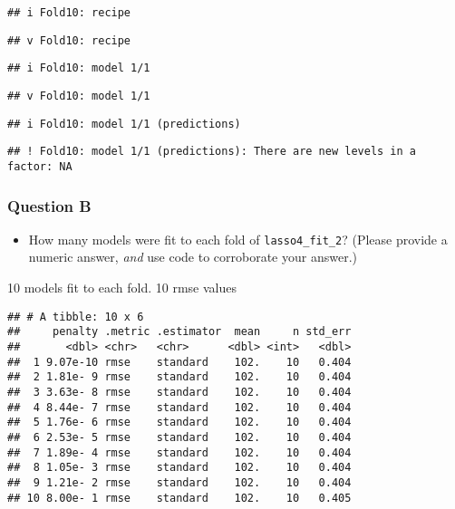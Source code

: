 \documentclass[
]{article}
\newenvironment{Shaded}{\begin{snugshade}}{\end{snugshade}}
\newcommand{\DataTypeTok}[1]{\textcolor[rgb]{0.13,0.29,0.53}{#1}}
\newcommand{\DecValTok}[1]{\textcolor[rgb]{0.00,0.00,0.81}{#1}}
\newcommand{\KeywordTok}[1]{\textcolor[rgb]{0.13,0.29,0.53}{\textbf{#1}}}
\newcommand{\NormalTok}[1]{#1}
\newcommand{\OperatorTok}[1]{\textcolor[rgb]{0.81,0.36,0.00}{\textbf{#1}}}
\newcommand{\StringTok}[1]{\textcolor[rgb]{0.31,0.60,0.02}{#1}}
\providecommand{\tightlist}{%
  \setlength{\itemsep}{0pt}\setlength{\parskip}{0pt}}
\begin{document}
\begin{verbatim}
## i Fold10: recipe
\end{verbatim}

\begin{verbatim}
## v Fold10: recipe
\end{verbatim}

\begin{verbatim}
## i Fold10: model 1/1
\end{verbatim}

\begin{verbatim}
## v Fold10: model 1/1
\end{verbatim}

\begin{verbatim}
## i Fold10: model 1/1 (predictions)
\end{verbatim}

\begin{verbatim}
## ! Fold10: model 1/1 (predictions): There are new levels in a factor: NA
\end{verbatim}

\hypertarget{question-b}{%
\subsubsection{Question B}\label{question-b}}

\begin{itemize}
\tightlist
\item
  How many models were fit to each fold of \texttt{lasso4\_fit\_2}?
  (Please provide a numeric answer, \emph{and} use code to corroborate
  your answer.)
\end{itemize}

10 models fit to each fold. 10 rmse values

\begin{Shaded}
\end{Shaded}

\begin{verbatim}
## # A tibble: 10 x 6
##     penalty .metric .estimator  mean     n std_err
##       <dbl> <chr>   <chr>      <dbl> <int>   <dbl>
##  1 9.07e-10 rmse    standard    102.    10   0.404
##  2 1.81e- 9 rmse    standard    102.    10   0.404
##  3 3.63e- 8 rmse    standard    102.    10   0.404
##  4 8.44e- 7 rmse    standard    102.    10   0.404
##  5 1.76e- 6 rmse    standard    102.    10   0.404
##  6 2.53e- 5 rmse    standard    102.    10   0.404
##  7 1.89e- 4 rmse    standard    102.    10   0.404
##  8 1.05e- 3 rmse    standard    102.    10   0.404
##  9 1.21e- 2 rmse    standard    102.    10   0.404
## 10 8.00e- 1 rmse    standard    102.    10   0.405
\end{verbatim}
\end{document}
